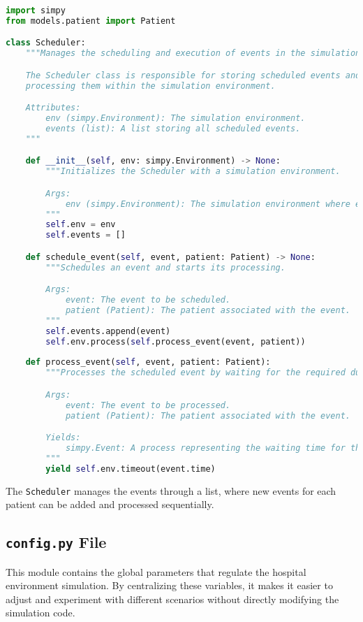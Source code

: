 \documentclass[a4paper,12pt]{article}
\begin{document}
\begin{lstlisting}[language=Python]
import simpy
from models.patient import Patient

class Scheduler:
    """Manages the scheduling and execution of events in the simulation.

    The Scheduler class is responsible for storing scheduled events and 
    processing them within the simulation environment.

    Attributes:
        env (simpy.Environment): The simulation environment.
        events (list): A list storing all scheduled events.
    """

    def __init__(self, env: simpy.Environment) -> None:
        """Initializes the Scheduler with a simulation environment.

        Args:
            env (simpy.Environment): The simulation environment where events will be scheduled.
        """
        self.env = env
        self.events = []

    def schedule_event(self, event, patient: Patient) -> None:
        """Schedules an event and starts its processing.

        Args:
            event: The event to be scheduled.
            patient (Patient): The patient associated with the event.
        """
        self.events.append(event)
        self.env.process(self.process_event(event, patient))
    
    def process_event(self, event, patient: Patient):
        """Processes the scheduled event by waiting for the required duration.

        Args:
            event: The event to be processed.
            patient (Patient): The patient associated with the event.

        Yields:
            simpy.Event: A process representing the waiting time for the event.
        """
        yield self.env.timeout(event.time)

\end{lstlisting}
The \texttt{Scheduler} manages the events through a list, where new events for each patient can be added and processed sequentially.

\subsection{\texttt{config.py} File}

This module contains the global parameters that regulate the hospital environment simulation. By centralizing these variables, it makes it easier to adjust and experiment with different scenarios without directly modifying the simulation code.
\end{document}
